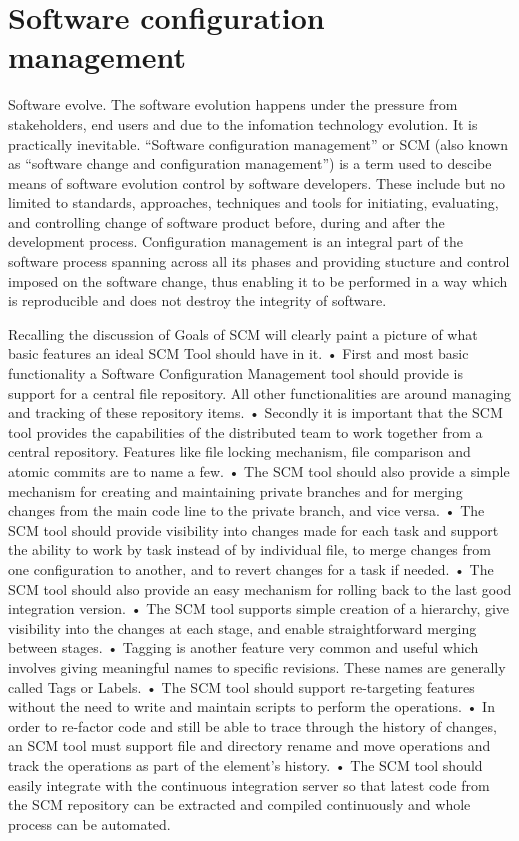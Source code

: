 \section{Software configuration management}
Software evolve. The software evolution happens under the pressure from stakeholders, end users and due to the infomation technology evolution. It is practically inevitable.
``Software configuration management'' or SCM (also known as ``software change and configuration management'') is a term used to descibe means of software evolution control by
software developers. These include but no limited to standards, approaches, techniques and tools for initiating, evaluating, and controlling change of software product before,
during and after the development process. Configuration management is an integral part of the software process spanning across all its phases and providing stucture and control
imposed on the software change, thus enabling it to be performed in a way which is reproducible and does not destroy the integrity of software.

Recalling the discussion of Goals of SCM will clearly paint a picture of what basic features an ideal SCM Tool should have in it.
•	First and most basic functionality a Software Configuration Management tool should provide is support for a central file repository. All other functionalities are around
managing and tracking of these repository items.
•	Secondly it is important that the SCM tool provides the capabilities of the distributed team to work together from a central repository. Features like file locking
mechanism, file comparison and atomic commits are to name a few.
•	The SCM tool should also provide a simple mechanism for creating and maintaining private branches and for merging changes from the main code line to the private branch, and
vice versa.
•	The SCM tool should provide visibility into changes made for each task and support the ability to work by task instead of by individual file, to merge changes from one
configuration to another, and to revert changes for a task if needed.
•	The SCM tool should also provide an easy mechanism for rolling back to the last good integration version.
•	The SCM tool supports simple creation of a hierarchy, give visibility into the changes at each stage, and enable straightforward merging between stages.
•	Tagging is another feature very common and useful which involves giving meaningful names to specific revisions. These names are generally called Tags or Labels.
•	The SCM tool should support re-targeting features without the need to write and maintain scripts to perform the operations.
•	In order to re-factor code and still be able to trace through the history of changes, an SCM tool must support file and directory rename and move operations and track the
operations as part of the element’s history.
•	The SCM tool should easily integrate with the continuous integration server so that latest code from the SCM repository can be extracted and compiled continuously and whole
process can be automated.


